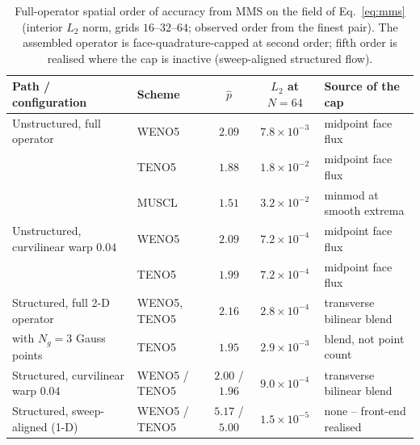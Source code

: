 \documentclass[journal,biblatex]{new-aiaa}
\begin{document}
\begin{table}[H]
\centering\footnotesize\setlength{\tabcolsep}{5pt}
\caption{Full-operator spatial order of accuracy from MMS on the field of
Eq.~\eqref{eq:mms} (interior $L_2$ norm, grids $16$--$32$--$64$; observed order
from the finest pair). The assembled operator is face-quadrature-capped at
second order; fifth order is realised where the cap is inactive
(sweep-aligned structured flow).}
\label{tab:spatial_order}
\begin{tabular}{@{}llccl@{}}
\toprule
Path / configuration & Scheme & $\hat p$ & $L_2$ at $N{=}64$ & Source of the cap \\
\midrule
Unstructured, full operator & WENO5 & $2.09$ & $7.8\times10^{-3}$ & midpoint face flux \\
 & TENO5 & $1.88$ & $1.8\times10^{-2}$ & midpoint face flux \\
 & MUSCL & $1.51$ & $3.2\times10^{-2}$ & minmod at smooth extrema \\
Unstructured, curvilinear warp $0.04$ & WENO5 & $2.09$ & $7.2\times10^{-4}$ & midpoint face flux \\
 & TENO5 & $1.99$ & $7.2\times10^{-4}$ & midpoint face flux \\
Structured, full 2-D operator & WENO5, TENO5 & $2.16$ & $2.8\times10^{-4}$ & transverse bilinear blend \\
\quad with $N_g{=}3$ Gauss points & TENO5 & $1.95$ & $2.9\times10^{-3}$ & blend, not point count \\
Structured, curvilinear warp $0.04$ & WENO5 / TENO5 & $2.00$ / $1.96$ & $9.0\times10^{-4}$ & transverse bilinear blend \\
Structured, sweep-aligned (1-D) & WENO5 / TENO5 & $5.17$ / $5.00$ & $1.5\times10^{-5}$ & none -- front-end realised \\
\bottomrule
\end{tabular}
\end{table}
\end{document}
